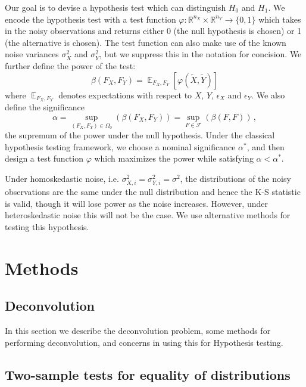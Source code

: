 \documentclass[12pt]{article}
\newcommand{\genericdel}[3]{%
  \left#1{#3}\right#2
}
\newcommand{\del}[1]{\genericdel(){#1}}
\newcommand{\sbr}[1]{\genericdel[]{#1}}
\DeclareMathOperator{\E}{\mathbb{E}}
\newcommand{\reals}{\mathbb{R}}
\newcommand{\power}{\beta}
\newcommand{\alldistribs}{\mathcal{F}}
\newcommand{\Xtilde}{\tilde{X}}
\newcommand{\Ytilde}{\tilde{Y}}
\begin{document}
Our goal is to devise a hypothesis test which can distinguish $H_0$ and $H_1$.
We encode the hypothesis test with a test function $\varphi: \reals^{n_X} \times \reals^{n_Y} \to \{0, 1\}$
which takes in the noisy observations and returns either 0 (the null hypothesis is chosen) or 1 (the alternative is chosen).
The test function can also make use of the known noise variances $\sigma_X^2$ and $\sigma_Y^2$, but we suppress this in the notation for concision.
We further define the power of the test:
\begin{equation}
    \power(F_X, F_Y) = \E_{F_X,F_Y}\sbr{\varphi(\Xtilde, \Ytilde)}
\end{equation}
where $\E_{F_X,F_Y}$ denotes expectations with respect to $X$, $Y$, $\epsilon_X$ and $\epsilon_Y$.
We also define the significance
\begin{equation}
    \alpha = \sup_{(F_X,F_Y) \in \Omega_0}\del{ \power(F_X, F_Y) } = \sup_{F \in \alldistribs}\del{ \power(F, F) }\,,
    \label{eq:significance}
\end{equation}
the supremum of the power under the null hypothesis.
Under the classical hypothesis testing framework, we choose a nominal significance $\alpha^*$,
and then design a test function $\varphi$ which maximizes the power while satisfying $\alpha < \alpha^*$.

Under homoskedastic noise, i.e. $\sigma^2_{X,i} = \sigma^2_{Y,i} = \sigma^2$, the distributions of the noisy observations are the same under the null distribution and hence the K-S statistic is valid, though it will lose power as the noise increases. However, under heteroskedastic noise this will not be the case. We use alternative methods for testing this hypothesis. 

\section{Methods} %
\label{sec:methods}

\subsection{Deconvolution} %
\label{sub:deconvolution}
In this section we describe the deconvolution problem, some methods for performing deconvolution, and concerns in using this for Hypothesis testing. 

\subsection{Two-sample tests for equality of distributions} %
\label{sub:two_sample_tests_for_equality_of_distributions}
\end{document}

